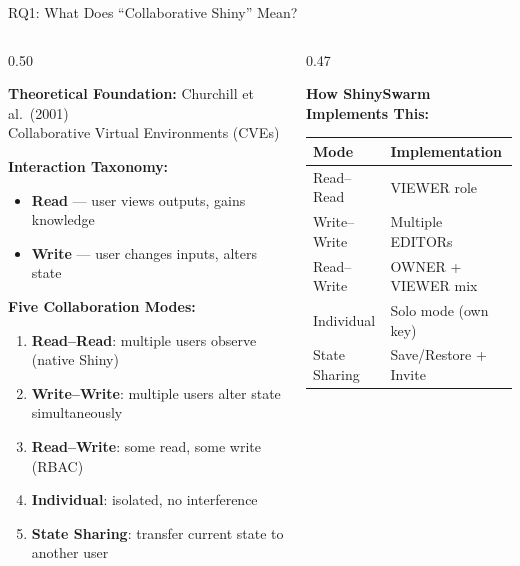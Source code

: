\documentclass[aspectratio=169]{beamer}
\begin{document}
\begin{frame}{RQ1: What Does ``Collaborative Shiny'' Mean?}

\begin{columns}[T]
\begin{column}{0.50\textwidth}

\textbf{Theoretical Foundation:} Churchill et al.\ (2001)\\
Collaborative Virtual Environments (CVEs)

\vspace{0.5em}
\textbf{Interaction Taxonomy:}
\begin{itemize}
    \item \textbf{Read} --- user views outputs, gains knowledge
    \item \textbf{Write} --- user changes inputs, alters state
\end{itemize}

\vspace{0.5em}
\textbf{Five Collaboration Modes:}
\begin{enumerate}
    \item \textbf{Read--Read}: multiple users observe (native Shiny)
    \item \textbf{Write--Write}: multiple users alter state simultaneously
    \item \textbf{Read--Write}: some read, some write (RBAC)
    \item \textbf{Individual}: isolated, no interference
    \item \textbf{State Sharing}: transfer current state to another user
\end{enumerate}

\end{column}
\begin{column}{0.47\textwidth}

\textbf{How ShinySwarm Implements This:}

\vspace{0.3em}
\begin{table}[h]
\centering
\small
\begin{tabular}{@{}ll@{}}
\toprule
\textbf{Mode} & \textbf{Implementation} \\
\midrule
Read--Read & VIEWER role \\
Write--Write & Multiple EDITORs \\
Read--Write & OWNER + VIEWER mix \\
Individual & Solo mode (own key) \\
State Sharing & Save/Restore + Invite \\
\bottomrule
\end{tabular}
\end{table}


\end{column}
\end{columns}
\end{frame}
\end{document}
